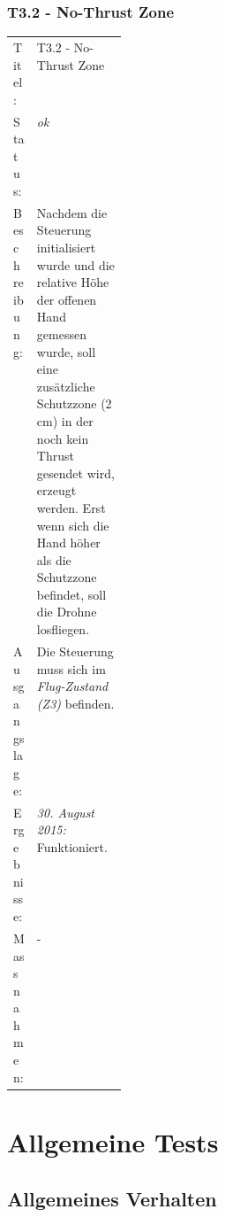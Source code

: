 \subsubsection{T3.2 - No-Thrust Zone}
\begin{table}[H]
	\centering
	\small\renewcommand{\arraystretch}{1.4}
	\begin{tabularx}{0.9\textwidth}{ L{0.15\linewidth} | X  }%
		\hline
		Titel: & T3.2 - No-Thrust Zone\\
		Status: & \textit{ok}\\
		Beschreibung: &  
		Nachdem die Steuerung initialisiert wurde und die relative Höhe der offenen Hand gemessen wurde, soll eine zusätzliche Schutzzone (2\,cm) in der noch kein Thrust gesendet wird, erzeugt werden.
		Erst wenn sich die Hand höher als die Schutzzone befindet, soll die Drohne losfliegen.
		\\
		Ausgangslage: & Die Steuerung muss sich im \textit{Flug-Zustand (Z3)} befinden.\\
		Ergebnisse: & \textit{30. August 2015:}
		Funktioniert.
		\\
		Massnahmen: & -\\
		\hline
	\end{tabularx}
\end{table}




\newpage
\section{Allgemeine Tests}
\label{sec:generalTest}
\subsection{Allgemeines Verhalten}
